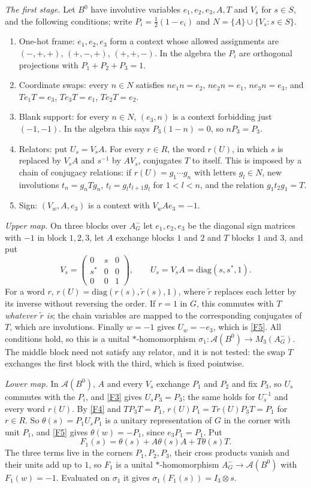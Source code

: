 \emph{The first stage.} Let $B^0$ have involutive variables $e_1,e_2,e_3,A,T$ and $V_s$ for $s\in S$, and the following
conditions; write $P_i=\frac12(1-e_i)$ and $N=\{A\}\cup\{V_s:s\in S\}$.
\begin{enumerate}[label=(F\arabic*),itemsep=1pt]
\item\label{F1} One-hot frame: $e_1,e_2,e_3$ form a context whose allowed assignments are $(-,+,+)$, $(+,-,+)$, $(+,+,-)$. In
the algebra the $P_i$ are orthogonal projections with $P_1+P_2+P_3=1$.
\item\label{F2} Coordinate swaps: every $n\in N$ satisfies $ne_1n=e_2$, $ne_2n=e_1$, $ne_3n=e_3$, and
$Te_1T=e_3$, $Te_3T=e_1$, $Te_2T=e_2$.
\item\label{F3} Blank support: for every $n\in N$, $(e_3,n)$ is a context forbidding just $(-1,-1)$. In the algebra this
says $P_3(1-n)=0$, so $nP_3=P_3$.
\item\label{F4} Relators: put $U_s=V_sA$. For every $r\in R$, the word $r(U)$, in which $s$ is replaced by $V_sA$ and $s^{-1}$
by $AV_s$, conjugates $T$ to itself. This is imposed by a chain of conjugacy relations: if $r(U)=g_1\cdots g_n$ with letters
$g_l\in N$, new involutions $t_n=g_nTg_n$, $t_l=g_lt_{l+1}g_l$ for $1<l<n$, and the relation $g_1t_2g_1=T$.
\item\label{F5} Sign: $(V_w,A,e_3)$ is a context with $V_wAe_3=-1$.
\end{enumerate}
\emph{Upper map.} On three blocks over $A_G^-$ let $e_1,e_2,e_3$ be the diagonal sign matrices with $-1$ in block $1,2,3$,
let $A$ exchange blocks $1$ and $2$ and $T$ blocks $1$ and $3$, and put
\[
V_s=\begin{pmatrix}0&s&0\\s^*&0&0\\0&0&1\end{pmatrix},\qquad U_s=V_sA=\mathrm{diag}(s,s^*,1).
\]
For a word $r$, $r(U)=\mathrm{diag}(r(s),\tilde r(s),1)$, where $\tilde r$ replaces each letter by its inverse without
reversing the order. If $r=1$ in $G$, this commutes with $T$ \emph{whatever $\tilde r$ is}; the chain variables are mapped
to the corresponding conjugates of $T$, which are involutions. Finally $w=-1$ gives $U_w=-e_3$, which is \ref{F5}. All
conditions hold, so this is a unital $*$-homomorphism $\sigma_1:\mathcal A(B^0)\to M_3(A_G^-)$. The middle block need not
satisfy any relator, and it is not tested: the swap $T$ exchanges the first block with the third, which is fixed pointwise.

\emph{Lower map.} In $\mathcal A(B^0)$, $A$ and every $V_s$ exchange $P_1$ and $P_2$ and fix $P_3$, so $U_s$ commutes with the
$P_i$, and \ref{F3} gives $U_sP_3=P_3$; the same holds for $U_s^{-1}$ and every word $r(U)$. By \ref{F4} and $TP_3T=P_1$,
$r(U)P_1=Tr(U)P_3T=P_1$ for $r\in R$. So $\theta(s)=P_1U_sP_1$ is a unitary representation of $G$ in the corner with unit
$P_1$, and \ref{F5} gives $\theta(w)=-P_1$, since $e_3P_1=P_1$. Put
\[
F_1(s)=\theta(s)+A\theta(s)A+T\theta(s)T .
\]
The three terms live in the corners $P_1,P_2,P_3$, their cross products vanish and their units add up to $1$, so $F_1$
is a unital $*$-homomorphism $A_G^-\to\mathcal A(B^0)$ with $F_1(w)=-1$. Evaluated on $\sigma_1$ it gives
$\sigma_1(F_1(s))=I_3\otimes s$.


